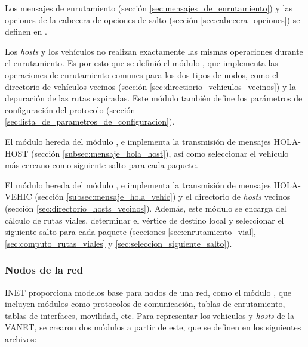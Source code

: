 Los mensajes de enrutamiento (sección \ref{sec:mensajes_de_enrutamiento})
y las opciones de la cabecera de opciones de salto (sección
\ref{sec:cabecera_opciones}) se definen en .

Los \textit{hosts} y los vehículos no realizan exactamente las mismas
operaciones durante el enrutamiento. Es por esto que se definió el módulo
, que implementa las operaciones de enrutamiento
comunes para los dos tipos de nodos, como el directorio de vehículos vecinos
(sección \ref{sec:directiorio_vehiculos_vecinos}) y la depuración de las rutas
expiradas. Este módulo también define los parámetros de configuración del
protocolo (sección \ref{sec:lista_de_parametros_de_configuracion}).

\begin{sloppypar}
El módulo  hereda del módulo
, e implementa la transmisión de mensajes
\mbox{HOLA-HOST} (sección \ref{subsec:mensaje_hola_host}), así como seleccionar
el vehículo más cercano como siguiente salto para cada paquete.
\end{sloppypar}

\begin{sloppypar}
El módulo  hereda del módulo
, e implementa la transmisión de mensajes
\mbox{HOLA-VEHIC} (sección \ref{subsec:mensaje_hola_vehic}) y el directorio de
\textit{hosts} vecinos (sección \ref{sec:directorio_hosts_vecinos}).
Además, este módulo se encarga del cálculo de rutas viales, determinar el vértice de destino
local y seleccionar el siguiente salto para cada paquete (secciones
\ref{sec:enrutamiento_vial}, \ref{sec:computo_rutas_viales} y
\ref{sec:seleccion_siguiente_salto}).
\end{sloppypar}

\subsubsection{Nodos de la red}
\label{subsubsec:nodos_de_la_red_sim}

INET proporciona modelos base para nodos de una red, como el módulo
\href{https://doc.omnetpp.org/inet/api-current/neddoc/inet.node.inet.AdhocHost.html}{},
que incluyen módulos como protocolos de comunicación, tablas de enrutamiento,
tablas de interfaces, movilidad, etc. Para representar los vehiculos y
\textit{hosts} de la VANET, se crearon dos módulos a partir de este, que se
definen en los siguientes archivos:

